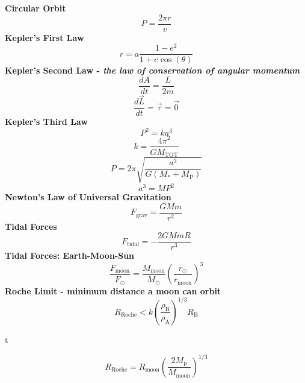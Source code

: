 \documentclass{article}
\begin{document}
\textbf {Circular Orbit}
\begin{equation}
P = \frac{2 \pi r}{v}
\end{equation}
\textbf {Kepler's First Law}
\begin{equation}
r = a \frac{1 - e^2}{1 + e \cos(\theta)}
\end{equation}
\textbf {Kepler's Second Law - \textit{the law of conservation of angular momentum}}
\begin{equation}
\frac{dA}{dt} = \frac{L}{2m}
\end{equation}
\begin{equation}
\frac{d\vec{L}}{dt} = \vec{\tau} = \vec{0}
\end{equation}
\textbf {Kepler's Third Law}
\begin{equation} \label{K3L_basic}
P^2 = k a^3
\end{equation}
\begin{equation} \label{K3L_constant}
k = \frac {4 \pi^2} {G M_\mathrm{TOT}} 
\end{equation}
\begin{equation}
P = 2 \pi \sqrt{\frac{a^3}{G (M_\mathrm{*} + M_\mathrm{P})}}
\end{equation}
\begin{equation}
a^3 = M P^2
\end{equation}
\textbf {Newton's Law of Universal Gravitation}
\begin{equation}
F_\mathrm{grav} = \frac {GMm} {r^2}
\end{equation}
\textbf {Tidal Forces}
\begin{equation}
F_\mathrm{tidal} =  - \frac {2GMmR} {r^3}
\end{equation}
\textbf {Tidal Forces: Earth-Moon-Sun}
\begin{equation}
\frac{F_\mathrm{moon}}{F_\odot} = \frac{M_\mathrm{moon}}{M_\odot} \left( \frac{r_\odot}{r_\mathrm{moon}} \right)^3
\end{equation}
\textbf {Roche Limit  - minimum distance a moon can orbit}
\begin{equation}
R_\mathrm{Roche} < k \left( \frac {\rho_\mathrm{B}} {\rho_\mathrm{A}} \right)^{1/3} R_\mathrm{B}
\end{equation}
\begin{center}t
\end{center}
\begin{equation}
R_\mathrm{Roche} = R_\mathrm{moon} \left( \frac{2 M_\mathrm{p}}{M_\mathrm{moon}} \right)^{1/3}
\end{equation}
\end{document}
